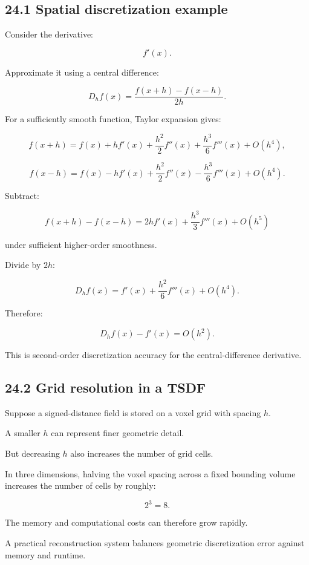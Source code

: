 \subsection{24.1 Spatial discretization example}\label{02-foundations-ii-ch029-spatial-discretization-example}

Consider the derivative:

\[ f'(x). \]

Approximate it using a central difference:

\[ D_hf(x)= \frac{f(x+h)-f(x-h)}{2h}. \]

For a sufficiently smooth function, Taylor expansion gives:

\[ f(x+h)= f(x)+hf'(x)+\frac{h^2}{2}f''(x) +\frac{h^3}{6}f'''(x)+O(h^4), \]

\[ f(x-h)= f(x)-hf'(x)+\frac{h^2}{2}f''(x) -\frac{h^3}{6}f'''(x)+O(h^4). \]

Subtract:

\[ f(x+h)-f(x-h) = 2hf'(x)+\frac{h^3}{3}f'''(x)+O(h^5) \]

under sufficient higher-order smoothness.

Divide by \(2h\):

\[ D_hf(x)= f'(x)+\frac{h^2}{6}f'''(x)+O(h^4). \]

Therefore:

\[ \boxed{ D_hf(x)-f'(x)=O(h^2) }. \]

This is second-order discretization accuracy for the central-difference derivative.

\subsection{24.2 Grid resolution in a TSDF}\label{02-foundations-ii-ch029-grid-resolution-in-a-tsdf}

Suppose a signed-distance field is stored on a voxel grid with spacing \(h\).

A smaller \(h\) can represent finer geometric detail.

But decreasing \(h\) also increases the number of grid cells.

In three dimensions, halving the voxel spacing across a fixed bounding volume increases the number of cells by roughly:

\[ 2^3=8. \]

The memory and computational costs can therefore grow rapidly.

A practical reconstruction system balances geometric discretization error against memory and runtime.

